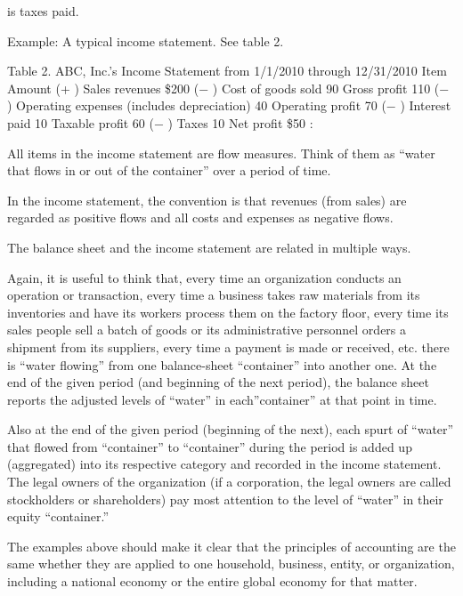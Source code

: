 \documentclass[
]{article}
\begin{document}
is taxes paid.

Example: A typical income statement. See table 2.

Table 2. ABC, Inc.'s Income Statement from 1/1/2010 through 12/31/2010
Item Amount (+ ) Sales revenues \$200 (− ) Cost of goods sold 90 Gross
profit 110 (− ) Operating expenses (includes depreciation) 40 Operating
profit 70 (− ) Interest paid 10 Taxable profit 60 (− ) Taxes 10 Net
profit \$50 :

All items in the income statement are flow measures. Think of them as
``water that flows in or out of the container'' over a period of time.

In the income statement, the convention is that revenues (from sales)
are regarded as positive flows and all costs and expenses as negative
flows.

The balance sheet and the income statement are related in multiple ways.

Again, it is useful to think that, every time an organization conducts
an operation or transaction, every time a business takes raw materials
from its inventories and have its workers process them on the factory
floor, every time its sales people sell a batch of goods or its
administrative personnel orders a shipment from its suppliers, every
time a payment is made or received, etc. there is ``water flowing'' from
one balance-sheet ``container'' into another one. At the end of the
given period (and beginning of the next period), the balance sheet
reports the adjusted levels of ``water'' in each''container'' at that
point in time.

Also at the end of the given period (beginning of the next), each spurt
of ``water'' that flowed from ``container'' to ``container'' during the
period is added up (aggregated) into its respective category and
recorded in the income statement. The legal owners of the organization
(if a corporation, the legal owners are called stockholders or
shareholders) pay most attention to the level of ``water'' in their
equity ``container.''

The examples above should make it clear that the principles of
accounting are the same whether they are applied to one household,
business, entity, or organization, including a national economy or the
entire global economy for that matter.
\end{document}
